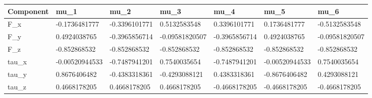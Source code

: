 \begin{tabular}{@{}lllllll@{}}
\toprule
Component & mu\_1 & mu\_2 & mu\_3 & mu\_4 & mu\_5 & mu\_6 \\
\midrule
F\_x & -0.1736481777 & -0.3396101771 & 0.5132583548 & 0.3396101771 & 0.1736481777 & -0.5132583548 \\
F\_y & 0.4924038765 & -0.3965856714 & -0.09581820507 & -0.3965856714 & 0.4924038765 & -0.09581820507 \\
F\_z & -0.852868532 & -0.852868532 & -0.852868532 & -0.852868532 & -0.852868532 & -0.852868532 \\
tau\_x & -0.00520944533 & -0.7487941201 & 0.7540035654 & -0.7487941201 & -0.00520944533 & 0.7540035654 \\
tau\_y & 0.8676406482 & -0.4383318361 & -0.4293088121 & 0.4383318361 & -0.8676406482 & 0.4293088121 \\
tau\_z & 0.4668178205 & 0.4668178205 & 0.4668178205 & -0.4668178205 & -0.4668178205 & -0.4668178205 \\
\bottomrule
\end{tabular}
